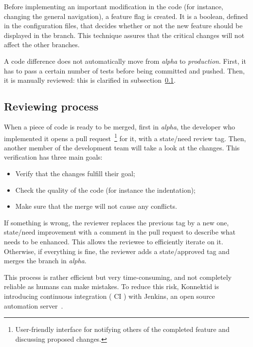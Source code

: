 Before implementing an important modification in the code (for instance, changing the general navigation), a \guillemotleft{} feature flag \guillemotright{} is created. It is a boolean, defined in the configuration files, that decides whether or not the new feature should be displayed in the branch. This technique assures that the critical changes will not affect the other branches.

A code difference does not automatically move from \textit{alpha} to \textit{production}. First, it has to pass a certain number of tests before being committed and pushed. Then, it is manually reviewed: this is clarified in {\sc subsection}~\ref{ssec:reviewing}.

\subsection{Reviewing process}
\label{ssec:reviewing}

When a piece of code is ready to be merged, first in \textit{alpha}, the developer who implemented it opens a pull request~\footnote{User-friendly interface for notifying others of the completed feature and discussing proposed changes.} for it, with a \guillemotleft{} state/need review \guillemotright{} tag. Then, another member of the development team will take a look at the changes. This verification has three main goals:

\begin{itemize}[noitemsep]
	\item Verify that the changes fulfill their goal;
 	\item Check the quality of the code (for instance the indentation);
	\item Make sure that the merge will not cause any conflicts.
\end{itemize}

If something is wrong, the reviewer replaces the previous tag by a new one, \guillemotleft{} state/need improvement \guillemotright{} with a comment in the pull request to describe what needs to be enhanced. This allows the reviewee to efficiently iterate on it. Otherwise, if everything is fine, the reviewer adds a \guillemotleft{} state/approved \guillemotright{} tag and merges the branch in \textit{alpha}.

This process is rather efficient but very time-consuming, and not completely reliable as humans can make mistakes. To reduce this risk, Konnektid is introducing continuous integration (\guillemotleft{} CI \guillemotright{}) with Jenkins, an open source automation server~\cite{jenkins}. 

